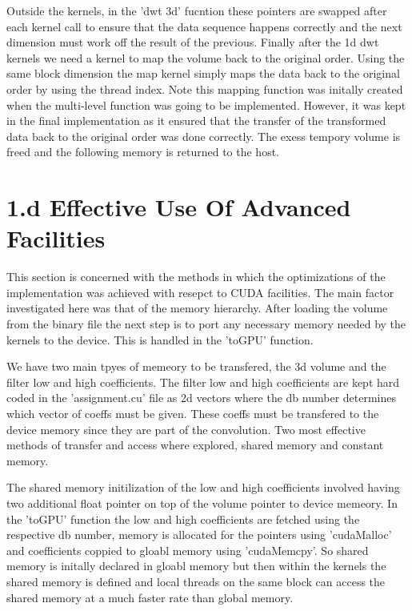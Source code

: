 \documentclass[journal,11pt]{IEEEtran}
\begin{document}
Outside the kernels, in the 'dwt 3d' fucntion these pointers are swapped after each kernel call to ensure that the data sequence happens correctly and the next dimension must work off the result of the previous. Finally after the 1d dwt kernels we need a kernel to map the volume back to the original order. Using the same block dimension the map kernel simply maps the data back to the original order by using the thread index. Note this mapping function was initally created when the multi-level function was going to be implemented. However, it was kept in the final implementation as it ensured that the transfer of the transformed data back to the original order was done correctly. The exess tempory volume is freed and the following memory is returned to the host.
 

\section{1.d Effective Use Of Advanced Facilities}

This section is concerned with the methods in which the optimizations of the implementation was achieved with resepct to CUDA facilities. The main factor investigated here was that of the memory hierarchy. After loading the volume from the binary file the next step is to port any necessary memory needed by the kernels to the device. This is handled in the 'toGPU' function.

We have two main tpyes of memeory to be transfered, the 3d volume and the filter low and high coefficients. The filter low and high coefficients are kept hard coded in the 'assignment.cu' file as 2d vectors where the db number determines which vector of coeffs must be given. These coeffs must be transfered to the device memory since they are part of the convolution. Two most effective methods of transfer and access where explored, shared memory and constant memory.

The shared memory initilization of the low and high coefficients involved having two additional float pointer on top of the volume pointer to device memeory. In the 'toGPU' function the low and high coefficients are fetched using the respective db number, memory is allocated for the pointers using 'cudaMalloc' and coefficients coppied to gloabl memory using 'cudaMemcpy'. So shared memory is initally declared in gloabl memory but then within the kernels the shared memory is defined and local threads on the same block can access the shared memory at a much faster rate than global memory. 
\end{document}
